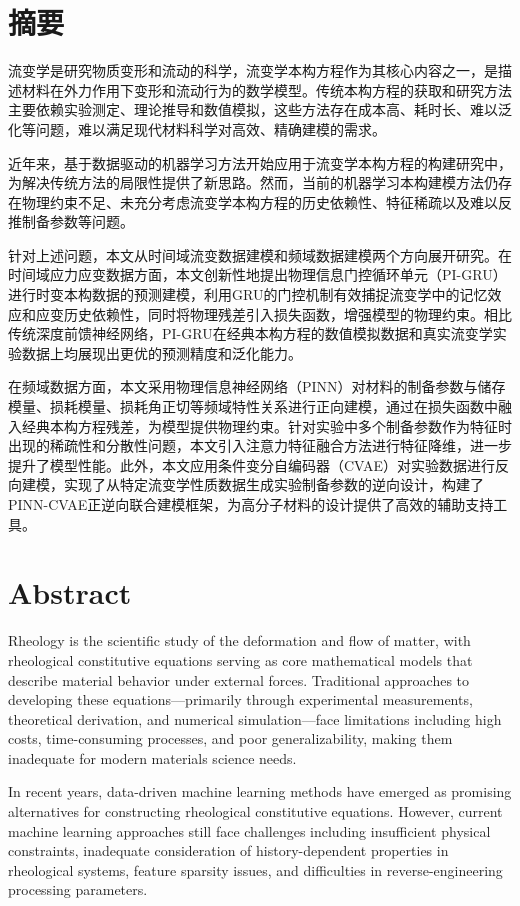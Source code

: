 \chapter{摘\texorpdfstring{\quad}{}要}
流变学是研究物质变形和流动的科学，流变学本构方程作为其核心内容之一，是描述材料在外力作用下变形和流动行为的数学模型。传统本构方程的获取和研究方法主要依赖实验测定、理论推导和数值模拟，这些方法存在成本高、耗时长、难以泛化等问题，难以满足现代材料科学对高效、精确建模的需求。

近年来，基于数据驱动的机器学习方法开始应用于流变学本构方程的构建研究中，为解决传统方法的局限性提供了新思路。然而，当前的机器学习本构建模方法仍存在物理约束不足、未充分考虑流变学本构方程的历史依赖性、特征稀疏以及难以反推制备参数等问题。

针对上述问题，本文从时间域流变数据建模和频域数据建模两个方向展开研究。在时间域应力应变数据方面，本文创新性地提出物理信息门控循环单元（PI-GRU）进行时变本构数据的预测建模，利用GRU的门控机制有效捕捉流变学中的记忆效应和应变历史依赖性，同时将物理残差引入损失函数，增强模型的物理约束。相比传统深度前馈神经网络，PI-GRU在经典本构方程的数值模拟数据和真实流变学实验数据上均展现出更优的预测精度和泛化能力。

在频域数据方面，本文采用物理信息神经网络（PINN）对材料的制备参数与储存模量、损耗模量、损耗角正切等频域特性关系进行正向建模，通过在损失函数中融入经典本构方程残差，为模型提供物理约束。针对实验中多个制备参数作为特征时出现的稀疏性和分散性问题，本文引入注意力特征融合方法进行特征降维，进一步提升了模型性能。此外，本文应用条件变分自编码器（CVAE）对实验数据进行反向建模，实现了从特定流变学性质数据生成实验制备参数的逆向设计，构建了PINN-CVAE正逆向联合建模框架，为高分子材料的设计提供了高效的辅助支持工具。

\chapter{Abstract}
Rheology is the scientific study of the deformation and flow of matter, with rheological constitutive equations serving as core mathematical models that describe material behavior under external forces. Traditional approaches to developing these equations—primarily through experimental measurements, theoretical derivation, and numerical simulation—face limitations including high costs, time-consuming processes, and poor generalizability, making them inadequate for modern materials science needs.

In recent years, data-driven machine learning methods have emerged as promising alternatives for constructing rheological constitutive equations. However, current machine learning approaches still face challenges including insufficient physical constraints, inadequate consideration of history-dependent properties in rheological systems, feature sparsity issues, and difficulties in reverse-engineering processing parameters.


